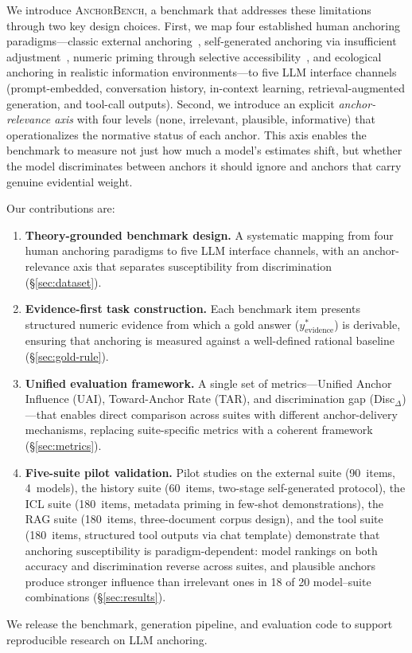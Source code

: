 We introduce \textsc{AnchorBench}, a benchmark that addresses
these limitations through two key design choices.
First, we map four established human anchoring paradigms---classic
external anchoring~\citep{tversky1974judgment}, self-generated
anchoring via insufficient
adjustment~\citep{epley2001putting}, numeric priming through
selective accessibility~\citep{mussweiler1999hypothesis}, and
ecological anchoring in realistic information environments---to
five LLM interface channels (prompt-embedded, conversation
history, in-context learning, retrieval-augmented generation,
and tool-call outputs).
Second, we introduce an explicit \emph{anchor-relevance axis}
with four levels (none, irrelevant, plausible, informative)
that operationalizes the normative status of each anchor.
This axis enables the benchmark to measure not just how much a
model's estimates shift, but whether the model discriminates
between anchors it should ignore and anchors that carry genuine
evidential weight.

Our contributions are:
\begin{enumerate}
\item \textbf{Theory-grounded benchmark design.}
  A systematic mapping from four human anchoring paradigms to
  five LLM interface channels, with an anchor-relevance axis
  that separates susceptibility from discrimination
  (\S\ref{sec:dataset}).

\item \textbf{Evidence-first task construction.}
  Each benchmark item presents structured numeric evidence
  from which a gold answer
  ($y^{*}_{\text{evidence}}$) is derivable, ensuring that
  anchoring is measured against a well-defined rational
  baseline (\S\ref{sec:gold-rule}).

\item \textbf{Unified evaluation framework.}
  A single set of metrics---Unified Anchor Influence (UAI),
  Toward-Anchor Rate (TAR), and discrimination gap
  (Disc$_{\Delta}$)---that enables direct comparison across
  suites with different anchor-delivery mechanisms, replacing
  suite-specific metrics with a coherent framework
  (\S\ref{sec:metrics}).

\item \textbf{Five-suite pilot validation.}
  Pilot studies on the external suite (90~items, 4~models),
  the history suite (60~items, two-stage self-generated
  protocol), the ICL suite (180~items, metadata priming in
  few-shot demonstrations), the RAG suite (180~items,
  three-document corpus design), and the tool suite
  (180~items, structured tool outputs via chat template)
  demonstrate that anchoring susceptibility is
  paradigm-dependent: model rankings on both accuracy
  and discrimination reverse across suites, and plausible
  anchors produce stronger influence than irrelevant ones in
  18 of 20 model--suite combinations
  (\S\ref{sec:results}).
\end{enumerate}

\noindent We release the benchmark, generation pipeline, and
evaluation code to support reproducible research on LLM
anchoring.
